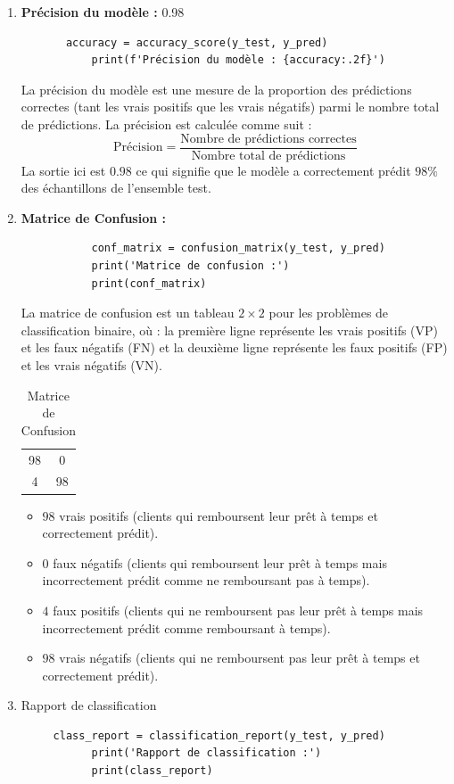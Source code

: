 \documentclass[12pt,a4paper,openay]{book}
\numberwithin{equation}{chapter}
\begin{document}
	\begin{enumerate}
	    \item \textbf{Pr\'ecision du mod\`ele :} 0.98
 	   
 	   \begin{verbatim}
 	   accuracy = accuracy_score(y_test, y_pred)
 	   	   print(f'Précision du modèle : {accuracy:.2f}')
 	   \end{verbatim}
 	   
 	   La pr\'ecision du mod\`ele est une mesure de la proportion des pr\'edictions correctes (tant les vrais positifs que les vrais n\'egatifs) parmi le nombre total de pr\'edictions. La pr\'ecision est calcul\'ee comme suit :
 	   \[
 	   \text{Pr\'ecision} = \frac{\text{Nombre de pr\'edictions correctes}}{\text{Nombre total de pr\'edictions}}
 	   \]
 	   La sortie ici est $0.98$ ce qui signifie que le mod\`ele a correctement pr\'edit $98\%$ des \'echantillons de l'ensemble test.
	
	\item \textbf{Matrice de Confusion :}
	\begin{verbatim}
		   conf_matrix = confusion_matrix(y_test, y_pred)
		   print('Matrice de confusion :')
		   print(conf_matrix)
	 \end{verbatim}
	 
	 La matrice de confusion est un tableau $2\times 2$ pour les probl\`emes de classification binaire, o\`u : la premi\`ere ligne repr\'esente les vrais positifs (VP) et les faux n\'egatifs (FN) et la deuxi\`eme ligne repr\'esente les faux positifs (FP) et les vrais n\'egatifs (VN).
	 \begin{table}[ht]
	 	    \centering
	 	    \begin{tabular}{|cc|}
	 	        \hline
	 	         98 & 0 \\
	 	         4 & 98 \\
	 	        \hline
	 	    \end{tabular}
	 	    \caption{Matrice de Confusion}
	 	    \label{tab:confusion_matrix}
	 	\end{table}
	 \begin{itemize}	 
	 	 \item $98$ vrais positifs (clients qui remboursent leur pr\^et \`a temps et correctement pr\'edit).
	 	 \item $0$ faux n\'egatifs (clients qui remboursent leur pr\^et \`a temps mais incorrectement pr\'edit comme ne remboursant pas \`a temps).
	 	 \item $4$ faux positifs (clients qui ne remboursent pas leur pr\^et \`a temps mais incorrectement pr\'edit comme remboursant \`a temps).
	 	 \item $98$ vrais n\'egatifs (clients qui ne remboursent pas leur pr\^et \`a temps et correctement pr\'edit).
	 \end{itemize}
	\item Rapport de classification
	\begin{verbatim}
	 class_report = classification_report(y_test, y_pred)
	 	   print('Rapport de classification :')
	 	   print(class_report)
	 \end{verbatim}
	 

\end{enumerate}
\end{document}
